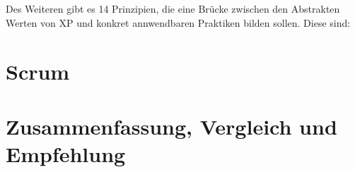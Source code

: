 \documentclass[a4paper, twopage]{scrreprt}
\begin{document}
\paragraph*{}
Des Weiteren gibt es 14 Prinzipien, die eine Brücke zwischen den Abstrakten Werten von XP und konkret annwendbaren Praktiken bilden sollen. Diese sind: \newline



\chapter{Scrum}
\label{ch:scrum}



\chapter{Zusammenfassung, Vergleich und Empfehlung}
\label{ch:zusammenfassung}



\nocite{*}
\printbibliography

\listoffigures
\end{document}
